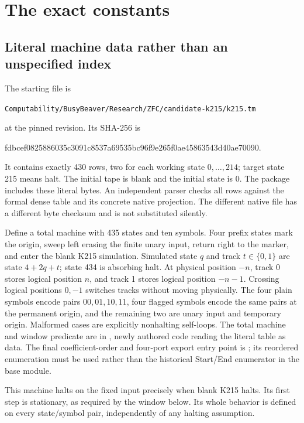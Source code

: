 \documentclass[11pt]{article}
\begin{document}
\section{The exact constants}\label{sec:constants}

\subsection{Literal machine data rather than an unspecified index}
The starting file is
\begin{center}\small
\texttt{Computability/BusyBeaver/Research/ZFC/candidate-k215/k215.tm}
\end{center}
at the pinned revision. Its SHA-256 is
\begin{center}\small\ttfamily
fdbcef0825886035c3091c8537a69535bc96f9e265f0ae45863543d40ae70090.
\end{center}
It contains exactly 430 rows, two for each working state \(0,\ldots,214\); target state 215 means halt. The initial tape is blank and the initial state is 0. The package includes these literal bytes. An independent parser checks all rows against the formal dense table and its concrete native projection. The different native file has a different byte checksum and is not substituted silently.

Define a total machine with 435 states and ten symbols. Four prefix states mark the origin, sweep left erasing the finite unary input, return right to the marker, and enter the blank K215 simulation. Simulated state \(q\) and track \(t\in\{0,1\}\) are state \(4+2q+t\); state 434 is absorbing halt. At physical position \(-n\), track 0 stores logical position \(n\), and track 1 stores logical position \(-n-1\). Crossing logical positions \(0,-1\) switches tracks without moving physically. The four plain symbols encode pairs \(00,01,10,11\), four flagged symbols encode the same pairs at the permanent origin, and the remaining two are unary input and temporary origin. Malformed cases are explicitly nonhalting self-loops. The total machine and window predicate are in , newly authored code reading the literal table as data. The final coefficient-order and four-port export entry point is ; its reordered enumeration must be used rather than the historical Start/End enumerator in the base module.

This machine halts on the fixed input precisely when blank K215 halts. Its first step is stationary, as required by the window below. Its whole behavior is defined on every state/symbol pair, independently of any halting assumption.
\end{document}
